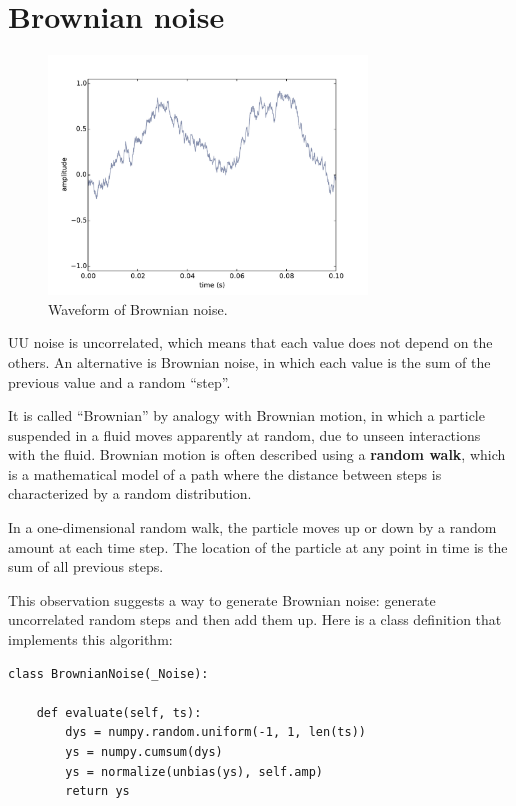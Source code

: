 \documentclass[12pt]{book}
\begin{document}
\section{Brownian noise}
\label{brownian}

\begin{figure}
\centerline{\includegraphics[height=2.5in]{figs/rednoise0.pdf}}
\caption{Waveform of Brownian noise.}
\label{fig.rednoise0}
\end{figure}

UU noise is uncorrelated, which means that each value does not depend
on the others.  An alternative is Brownian noise, in which each value
is the sum of the previous value and a random ``step''.

It is called ``Brownian'' by analogy with Brownian motion, in which a
particle suspended in a fluid moves apparently at random, due to
unseen interactions with the fluid.  Brownian motion is often
described using a {\bf random walk}, which is a mathematical model 
of a path where the distance between steps is characterized by a
random distribution.

In a one-dimensional random walk, the particle moves up or down
by a random amount at each time step.  The location of the particle
at any point in time is the sum of all previous steps.

This observation suggests a way to generate Brownian noise:
generate uncorrelated random steps and then add them up.
Here is a class definition that implements this algorithm:

\begin{verbatim}
class BrownianNoise(_Noise):

    def evaluate(self, ts):
        dys = numpy.random.uniform(-1, 1, len(ts))
        ys = numpy.cumsum(dys)
        ys = normalize(unbias(ys), self.amp)
        return ys
\end{verbatim}
\end{document}
